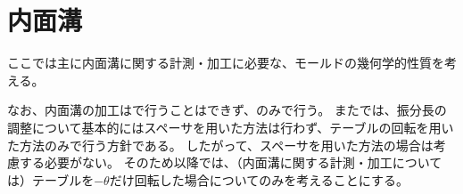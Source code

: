 \chapter{内面溝}
ここでは主に内面溝に関する計測・加工に必要な、モールドの幾何学的性質を考える。

なお、内面溝の加工は\MMname で行うことはできず、\DMname のみで行う。
また\DMname では、振分長の調整について基本的にはスペーサを用いた方法は行わず、テーブルの回転を用いた方法のみで行う方針である。
したがって、スペーサを用いた方法の場合は考慮する必要がない。
そのため以降では、（内面溝に関する計測・加工については）テーブルを$-\theta$だけ回転した場合についてのみを考えることにする。




